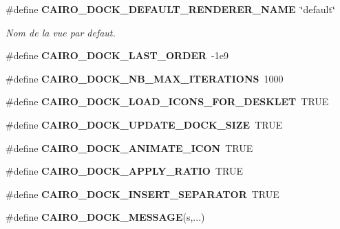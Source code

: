\begin{CompactItemize}
\#define {\bf CAIRO\_\-DOCK\_\-DEFAULT\_\-RENDERER\_\-NAME}~\char`\"{}default\char`\"{}
\begin{CompactList}\small\item\em Nom de la vue par defaut. \item\end{CompactList}\item 
\#define {\bf CAIRO\_\-DOCK\_\-LAST\_\-ORDER}~-1e9
\item 
\#define {\bf CAIRO\_\-DOCK\_\-NB\_\-MAX\_\-ITERATIONS}~1000
\item 
\#define {\bf CAIRO\_\-DOCK\_\-LOAD\_\-ICONS\_\-FOR\_\-DESKLET}~TRUE
\item 
\#define {\bf CAIRO\_\-DOCK\_\-UPDATE\_\-DOCK\_\-SIZE}~TRUE
\item 
\#define {\bf CAIRO\_\-DOCK\_\-ANIMATE\_\-ICON}~TRUE
\item 
\#define {\bf CAIRO\_\-DOCK\_\-APPLY\_\-RATIO}~TRUE
\item 
\#define {\bf CAIRO\_\-DOCK\_\-INSERT\_\-SEPARATOR}~TRUE
\item 
\#define {\bf CAIRO\_\-DOCK\_\-MESSAGE}(s,...)
\end{CompactItemize}

